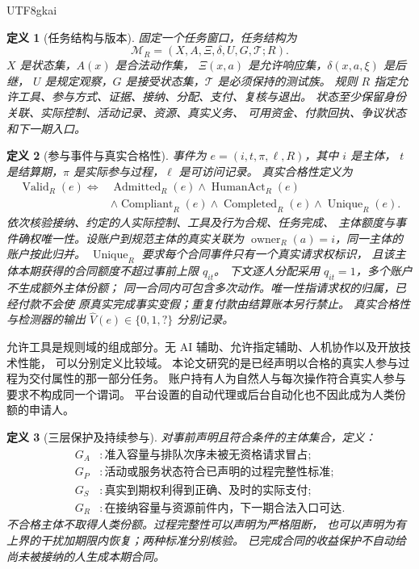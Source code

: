 \documentclass[12pt,a4paper,openany]{report}
\newtheorem{definition}{定义}[chapter]
\newcommand{\Valid}{\operatorname{Valid}}
\newcommand{\Human}{\operatorname{HumanAct}}
\begin{document}
\begin{CJK*}{UTF8}{gkai}
\begin{definition}[任务结构与版本]
\label{def:task}
固定一个任务窗口，任务结构为
\[
\mathcal M_R=(X,A,\Xi,\delta,U,G,\mathcal T;R).
\]
\(X\) 是状态集，\(A(x)\) 是合法动作集，
\(\Xi(x,a)\) 是允许响应集，\(\delta(x,a,\xi)\) 是后继，
\(U\) 是规定观察，\(G\) 是接受状态集，\(\mathcal T\) 是必须保持的测试族。
规则 \(R\) 指定允许工具、参与方式、证据、接纳、分配、支付、复核与退出。
状态至少保留身份关联、实际控制、活动记录、资源、真实义务、
可用资金、付款回执、争议状态和下一期入口。
\end{definition}

\begin{definition}[参与事件与真实合格性]
\label{def:valid}
事件为 \(e=(i,t,\pi,\ell,R)\)，其中 \(i\) 是主体，
\(t\) 是结算期，\(\pi\) 是实际参与过程，\(\ell\) 是可访问记录。
真实合格性定义为
\[
\begin{aligned}
\Valid_R(e)\Longleftrightarrow{}&
\operatorname{Admitted}_R(e)\land\Human_R(e)\\
&\land\operatorname{Compliant}_R(e)
\land\operatorname{Completed}_R(e)
\land\operatorname{Unique}_R(e).
\end{aligned}
\]
依次核验接纳、约定的人实际控制、工具及行为合规、任务完成、
主体额度与事件确权唯一性。设账户到规范主体的真实关联为
\(\operatorname{owner}_R(a)=i\)，同一主体的账户按此归并。
\(\operatorname{Unique}_R\) 要求每个合同事件只有一个真实请求权标识，
且该主体本期获得的合同额度不超过事前上限 \(q_{it}\)。
下文逐人分配采用 \(q_{it}=1\)，多个账户不生成额外主体份额；
同一合同内可包含多次动作。唯一性指请求权的归属，已经付款不会使
原真实完成事实变假；重复付款由结算账本另行禁止。
真实合格性与检测器的输出
\(\widehat V(e)\in\{0,1,?\}\) 分别记录。
\end{definition}

允许工具是规则域的组成部分。无 AI 辅助、允许指定辅助、人机协作以及开放技术性能，
可以分别定义比较域\cite{ECompetition}。
本论文研究的是已经声明以合格的真实人参与过程为交付属性的那一部分任务。
账户持有人为自然人与每次操作符合真实人参与要求不构成同一个谓词。
平台设置的自动代理或后台自动化也不因此成为人类份额的申请人。

\begin{definition}[三层保护及持续参与]
\label{def:goals}
对事前声明且符合条件的主体集合，定义：
\[
\begin{aligned}
G_A &: \text{准入容量与排队次序未被无资格请求冒占};\\
G_P &: \text{活动或服务状态符合已声明的过程完整性标准};\\
G_S &: \text{真实到期权利得到正确、及时的实际支付};\\
G_R &: \text{在接纳容量与资源前件内，下一期合法入口可达}.
\end{aligned}
\]
不合格主体不取得人类份额。过程完整性可以声明为严格阻断，
也可以声明为有上界的干扰加期限内恢复；两种标准分别核验。
已完成合同的收益保护不自动给尚未被接纳的人生成本期合同。
\end{definition}


\end{CJK*}
\end{document}
